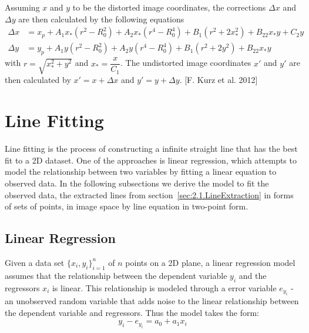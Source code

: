 Assuming $x$ and $y$ to be the distorted image coordinates, the corrections $\Delta x$ and $\Delta y$ are then calculated by the following equations
\begin{equation} %
\begin{split}
\Delta x &= x_p + A_1x_*(r^2-R_0^2) + A_2x_*(r^4-R_0^4) + B_1(r^2+2x_*^2) + B_22x_*y+C_2y \\
\Delta y &= y_p + A_1y  (r^2-R_0^2) + A_2y  (r^4-R_0^4) + B_1(r^2+2y^2)   + B_22x_*y
\end{split}
\end{equation}
with $r=\sqrt{x_*^2+y^2}$ and $x_*=\dfrac{x}{C_1}$. The undistorted image coordinates $x\prime$ and $y\prime$ are then calculated by $x\prime=x+\Delta x$ and $y\prime=y+\Delta y$. [F. Kurz et al. 2012] 



\section{Line Fitting}
\label{sec:2.3.LineFitting}

Line fitting is the process of constructing a infinite straight line that has the best fit to a 2D dataset. One of the approaches is linear regression, which attempts to model the relationship between two variables by fitting a linear equation to observed data. In the following subsections we derive the model to fit the observed data, the extracted lines from section~\ref{sec:2.1.LineExtraction} in forms of sets of points, in image space by line equation in two-point form.

\subsection{Linear Regression}
\label{subsec:2.3.1}
Given a data set $\{x_i,y_i\}^n_{i=1}$ of $n$ points on a 2D plane, a linear regression model assumes that the relationship between the dependent variable $y_i$ and the regressors $x_i$ is linear. This relationship is modeled through a error variable $e_{y_i}$ -an unobserved random variable that adds noise to the linear relationship between the dependent variable and regressors.
Thus the model takes the form:
\begin{equation} %
y_i - e_{y_i} = a_0 + a_1x_i
\end{equation}

